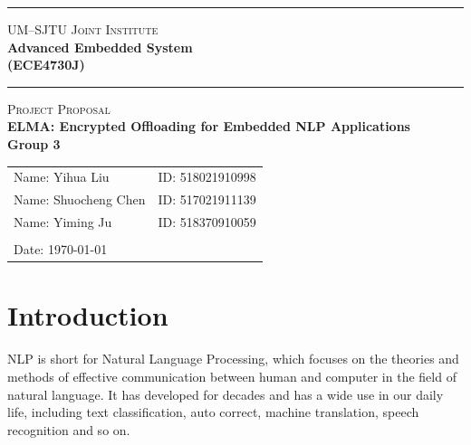 \documentclass[a4paper]{article}
\begin{document}
\begin{titlepage}
    \vspace*{0.25cm}
    \noindent\rule[0.25\baselineskip]{\textwidth}{1pt}
    \begin{center}
        \huge{\textsc{UM--SJTU Joint Institute}}\vspace{0.3em}\\
        \huge{\textbf{Advanced Embedded System}}\vspace{0.3em}\\
        \Large{\textbf{(ECE4730J)}}
        \noindent\rule[0.25\baselineskip]{\textwidth}{1pt}
    \end{center}
    \begin{center}
        \vspace{5cm}
        \Large{\textsc{Project Proposal}}\vspace{0.5em}\\
        \Large{\textbf{ELMA: Encrypted Offloading for Embedded NLP Applications}}\vspace{1em}\\
        \Large{\textbf{Group 3}}\\
    \end{center}
    \vfill
    \large
    \begin{tabular}{ll}
        Name: Yihua Liu \hspace*{2em}&ID: 518021910998\hspace*{2em}\\
        Name: Shuocheng Chen \hspace*{2em}&ID: 517021911139\hspace*{2em}\\
        Name: Yiming Ju \hspace*{2em}&ID: 518370910059\hspace*{2em}\\
        \\
        Date: \today
    \end{tabular}
\end{titlepage}
\tableofcontents
\newpage
\section{Introduction}
NLP is short for Natural Language Processing, which focuses on the theories and methods of effective communication between human and computer in the field of natural language. It has developed for decades and has a wide use in our daily life, including text classification, auto correct, machine translation, speech recognition and so on. 
\end{document}
